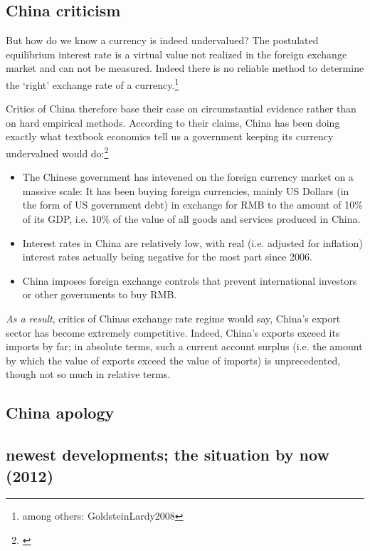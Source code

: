 \documentclass[11pt]{article}
\begin{document}

\subsection{China criticism}

But how do we know a currency is indeed undervalued? The postulated equilibrium interest rate is a virtual value not realized in the foreign exchange market and can not be measured. Indeed there is no reliable method to determine the `right' exchange rate of a currency.\footnote{among others: \cite{pp. 4}{GoldsteinLardy2008}}

Critics of China therefore base their case on circumstantial evidence rather than on hard empirical methods. %
According to their claims, China has been doing exactly what textbook economics tell us a government keeping its currency undervalued would do:\footnote{\cite[pp. 40]{GoldsteinLardy2008}}

\begin{itemize}
\item{The Chinese government has intevened on the foreign currency market on a massive scale: It has been buying foreign currencies, mainly US Dollars (in the form of US government debt) in exchange for RMB to the amount of 10\% of its GDP, i.e. 10\% of the value of all goods and services produced in China.} %
\item{Interest rates in China are relatively low, with real (i.e. adjusted for inflation) interest rates actually being negative for the most part since 2006.} %
\item{China imposes foreign exchange controls that prevent international investors or other governments to buy RMB.}%
\end{itemize}

\emph{As a result}, critics of Chinas exchange rate regime would say, China's export sector has become extremely competitive. Indeed, China's exports exceed its imports by far; in absolute terms, such a current account surplus (i.e. the amount by which the value of exports exceed the value of imports) is unprecedented, though not so much in relative terms. %
 

\subsection{China apology}


\subsection{newest developments; the situation by now (2012)}
\end{document}
